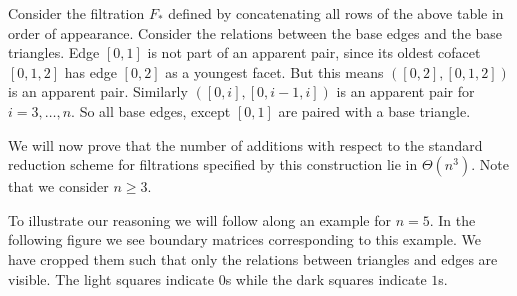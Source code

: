 Consider the filtration $F_*$ defined by concatenating all rows of the above table in order of appearance. Consider the relations between the base edges and the base triangles. Edge $[0,1]$ is not part of an apparent pair, since its oldest cofacet $[0,1,2]$ has edge $[0,2]$ as a youngest facet. But this means $([0,2],[0,1,2])$ is an apparent pair. Similarly $([0,i],[0,i-1,i])$ is an apparent pair for $i = 3,\dots,n$.
So all base edges, except $[0,1]$ are paired with a base triangle. 

We will now prove that the number of additions with respect to the standard reduction scheme for filtrations specified by this construction lie in $\Theta(n^3)$. Note that we consider $n \geq 3$.

To illustrate our reasoning we will follow along an example for $n = 5$. In the following figure we see boundary matrices corresponding to this example. We have cropped them such that only the relations between triangles and edges are visible. The light squares indicate $0$s while the dark squares indicate $1$s.

